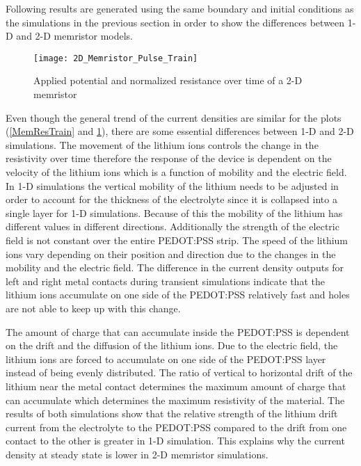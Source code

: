 \begin{doublespace}
Following results are generated using the same boundary and initial conditions as the simulations in the previous section in order to show the differences between 1-D and 2-D memristor models.

\begin{figure}[!htp]
\centering
\texttt{[image: 2D\_Memristor\_Pulse\_Train]}
\caption{Applied potential and normalized resistance over time of a 2-D memristor} 
\label{2D_mem_train}
\end{figure}

 Even though the general trend of the current densities are similar for the plots (\ref{MemResTrain} and \ref{2D_mem_train}), there are some essential differences between 1-D and 2-D simulations. The movement of the lithium ions controls the change in the resistivity over time therefore the response of the device is dependent on the velocity of the lithium ions which is a function of mobility and the electric field. In 1-D simulations the vertical mobility of the lithium needs to be adjusted in order to account for the thickness of the electrolyte since it is collapsed into a single layer for 1-D simulations. Because of this the mobility of the lithium has different values in different directions. Additionally the strength of the electric field is not constant over the entire PEDOT:PSS strip. The speed of the lithium ions vary depending on their position and direction due to the changes in the mobility and the electric field. The difference in the current density outputs for left and right metal contacts during transient simulations indicate that the lithium ions accumulate on one side of the PEDOT:PSS relatively fast and holes are not able to keep up with this change. 
 
The amount of charge that can accumulate inside the PEDOT:PSS is dependent on the drift and the diffusion of the lithium ions. Due to the electric field, the lithium ions are forced to accumulate on one side of the PEDOT:PSS layer instead of being evenly distributed. The ratio of vertical to horizontal drift of the lithium near the metal contact determines the maximum amount of charge that can accumulate which determines the maximum resistivity of the material. The results of both simulations show that the relative strength of the lithium drift current from the electrolyte to the PEDOT:PSS compared to the drift from one contact to the other is greater in 1-D simulation. This explains why the current density at steady state is lower in 2-D memristor simulations. 


\end{doublespace}
